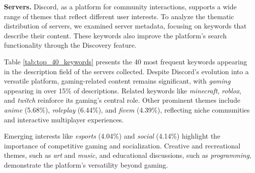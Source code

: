 
\textbf{Servers.} Discord, as a platform for community interactions, supports a wide range of themes that reflect different user interests. To analyze the thematic distribution of servers, we examined server metadata, focusing on keywords that describe their content. These keywords also improve the platform's search functionality through the Discovery feature.

Table \ref{tab:top_40_keywords} presents the 40 most frequent keywords appearing in the description field of the servers collected. Despite Discord's evolution into a versatile platform, gaming-related content remains significant, with \textit{gaming} appearing in over 15\% of descriptions. Related keywords like \textit{minecraft}, \textit{roblox}, and \textit{twitch} reinforce its gaming's central role. Other prominent themes include \textit{anime} (5.68\%), \textit{roleplay} (6.44\%), and \textit{fivem} (4.39\%), reflecting niche communities and interactive multiplayer experiences. 

Emerging interests like \textit{esports} (4.04\%) and \textit{social} (4.14\%) highlight the importance of competitive gaming and socialization. Creative and recreational themes, such as \textit{art} and \textit{music}, and educational discussions, such as \textit{programming}, demonstrate the platform's versatility beyond gaming.

